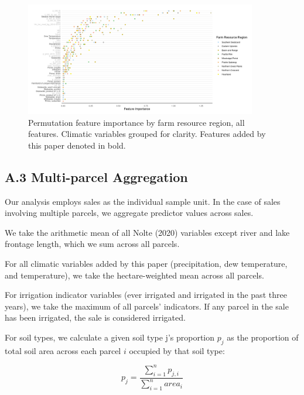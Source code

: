 \documentclass[12pt]{article}
\begin{document}
\begin{figure}[H]
    \centering
    \includegraphics[width=0.9\textwidth]{exhibits/ffb_importance_all.png}
    \caption{Permutation feature importance by farm resource region, all features. Climatic variables grouped for clarity. Features added by this paper denoted in bold.}
    \label{fig:ffb_importance_all}
\end{figure}

\newpage

\subsection*{A.3 Multi-parcel Aggregation}
Our analysis employs sales as the individual sample unit. In the case of sales involving multiple parcels, we aggregate predictor values across sales. 

We take the arithmetic mean of all Nolte (2020) variables except river and lake frontage length, which we sum across all parcels.

For all climatic variables added by this paper (precipitation, dew temperature, and temperature), we take the hectare-weighted mean across all parcels.

For irrigation indicator variables (ever irrigated and irrigated in the past three years), we take the maximum of all parcels' indicators. If any parcel in the sale has been irrigated, the sale is considered irrigated.

For soil types, we calculate a given soil type j's proportion $p_j$ as the proportion of total soil area across each parcel $i$ occupied by that soil type:

\[
p_j = \displaystyle\frac{\sum\limits_{i=1}^{n}p_{j,i}}{\sum\limits_{i=1}^{n}area_i}
\]


\newpage


\printbibliography
\end{document}
